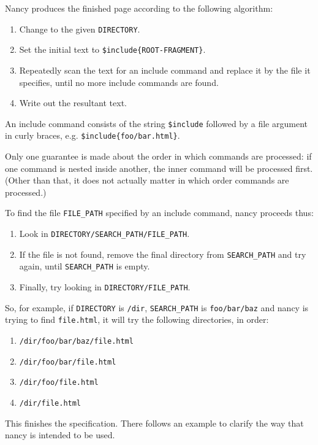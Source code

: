 \documentclass[english]{scrartcl}
\begin{document}
Nancy produces the finished page according to the following algorithm:

\begin{enumerate}
\item Change to the given \texttt{DIRECTORY}.
\item Set the initial text to \texttt{\$include\{ROOT-FRAGMENT\}}.
\item Repeatedly scan the text for an include command and replace it
  by the file it specifies, until no more include commands are
  found.\item Write out the resultant text.
\end{enumerate}

An include command consists of the string \texttt{\$include} followed
by a file argument in curly braces, e.g.
\texttt{\$include\{foo/bar.html\}}.

Only one guarantee is made about the order in which commands are
processed: if one command is nested inside another, the inner command
will be processed first. (Other than that, it does not actually matter
in which order commands are processed.)

To find the file \texttt{FILE\_PATH} specified by an include command,
nancy proceeds thus:

\begin{enumerate}
\item Look in \texttt{DIRECTORY/SEARCH\_PATH/FILE\_PATH}.
\item If the file is not found, remove the final directory from
  \texttt{SEARCH\_PATH} and try again, until \texttt{SEARCH\_PATH} is
  empty.\item Finally, try looking in \texttt{DIRECTORY/FILE\_PATH}.
\end{enumerate}

So, for example, if \texttt{DIRECTORY} is \texttt{/dir},
\texttt{SEARCH\_PATH} is \texttt{foo/bar/baz} and nancy is trying to
find \texttt{file.html}, it will try the following directories, in
order:

\begin{enumerate}
\item \texttt{/dir/foo/bar/baz/file.html}
\item \texttt{/dir/foo/bar/file.html}
\item \texttt{/dir/foo/file.html}
\item \texttt{/dir/file.html}
\end{enumerate}

This finishes the specification. There follows an example to clarify
the way that nancy is intended to be used.
\end{document}
